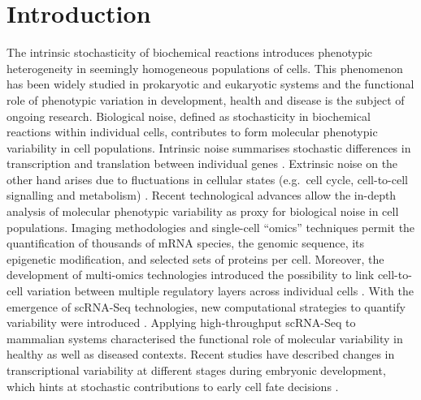 
\chapter{Introduction}  

\vspace{-1cm}

\graphicspath{{"Figs/Introduction/"}}

\begin{Abstract}
\hspace{-5mm} The intrinsic stochasticity of biochemical reactions introduces phenotypic heterogeneity in seemingly homogeneous populations of cells. 
This phenomenon has been widely studied in prokaryotic and eukaryotic systems and the functional role of phenotypic variation in development, health and disease is the subject of ongoing research. 
Biological noise, defined as stochasticity in biochemical reactions within individual cells, contributes to form molecular phenotypic variability in cell populations. 
Intrinsic noise summarises stochastic differences in transcription and translation between individual genes \citep{Elowitz2002, Raser2004, Sanchez2013}. 
Extrinsic noise on the other hand arises due to fluctuations in cellular states (e.g.~cell cycle, cell-to-cell signalling and metabolism)  \citep{Zopf2013, Iwamoto2016, Kiviet2014}. 
Recent technological advances allow the in-depth analysis of molecular phenotypic variability as proxy for biological noise in cell populations. 
Imaging methodologies \citep{Chen2015} and single-cell “omics” techniques \citep{Bock2016} permit the quantification of thousands of mRNA species, the genomic sequence, its epigenetic modification, and selected sets of proteins per cell. 
Moreover, the development of multi-omics technologies introduced the possibility to link cell-to-cell variation between multiple regulatory layers across individual cells \citep{Macaulay2017}. 
With the emergence of \gls{scRNA-Seq} technologies, new computational strategies to quantify variability were introduced \cite{Brennecke2013, Vallejos2015BASiCS, Kolodziejczyk2015cell, Buettner2015, Fan2016, Richard2016}. 
Applying high-throughput scRNA-Seq to mammalian systems characterised the functional role of molecular variability in healthy as well as diseased contexts. 
Recent studies have described changes in transcriptional variability at different stages during embryonic development, which hints at stochastic contributions to early cell fate decisions \citep{Goolam2016, Mohammed2017, Ohnishi2014}. 

\end{Abstract}
